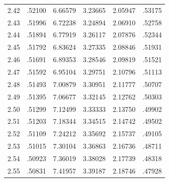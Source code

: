 \begin{minipage}{0.47\textwidth}
\begin{tabular}{c|c|c|c|c|c}
        2.42 & .52100 & 6.66579 & 3.23665 & 2.05947 & .53175 \\
        2.43 & .51996 & 6.72238 & 3.24894 & 2.06910 & .52758 \\
        2.44 & .51894 & 6.77919 & 3.26117 & 2.07876 & .52344 \\
        2.45 & .51792 & 6.83624 & 3.27335 & 2.08846 & .51931 \\
        2.46 & .51691 & 6.89353 & 3.28546 & 2.09819 & .51521 \\
        2.47 & .51592 & 6.95104 & 3.29751 & 2.10796 & .51113 \\
        2.48 & .51493 & 7.00879 & 3.30951 & 2.11777 & .50707 \\
        2.49 & .51395 & 7.06677 & 3.32145 & 2.12762 & .50303 \\
        2.50 & .51299 & 7.12499 & 3.33333 & 2.13750 & .49902 \\
        2.51 & .51203 & 7.18344 & 3.34515 & 2.14742 & .49502 \\
        2.52 & .51109 & 7.24212 & 3.35692 & 2.15737 & .49105 \\
        2.53 & .51015 & 7.30104 & 3.36863 & 2.16736 & .48711 \\
        2.54 & .50923 & 7.36019 & 3.38028 & 2.17739 & .48318 \\
        2.55 & .50831 & 7.41957 & 3.39187 & 2.18746 & .47928
    \end{tabular}
\end{minipage}%
\vline
